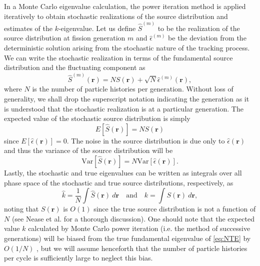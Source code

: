 In a Monte Carlo eigenvalue calculation, the power iteration method is applied
iteratively to obtain stochastic realizations of the source distribution and
estimates of the $k$-eigenvalue. Let us define $\hat{S}^{(m)}$ to be the
realization of the source distribution at fission generation $m$ and
$\hat{\epsilon}^{(m)}$ be the deviation from the deterministic solution arising
from the stochastic nature of the tracking process. We can write the stochastic
realization in terms of the fundamental source distribution and the fluctuating
component as \cite{ane-brissenden-1986}
\begin{equation}
  \label{eq:source}
  \hat{S}^{(m)}(\mathbf{r})= N S(\mathbf{r}) + \sqrt{N}
  \hat{\epsilon}^{(m)}(\mathbf{r}),
\end{equation}
where $N$ is the number of particle histories per generation. Without loss of
generality, we shall drop the superscript notation indicating the generation as
it is understood that the stochastic realization is at a particular
generation. The expected value of the stochastic source distribution is simply
\begin{equation}
  E \left[ \hat{S}(\mathbf{r})\right] = N S (\mathbf{r})
\end{equation}
since $E \left[ \hat{\epsilon}(\mathbf{r})\right] = 0$. The noise in the source
distribution is due only to $\hat{\epsilon}(\mathbf{r})$ and thus the variance
of the source distribution will be
\begin{equation}
  \text{Var} \left[ \hat{S}(\mathbf{r})\right] = N \text{Var} \left[
    \hat{\epsilon}(\mathbf{r}) \right].
\end{equation}
Lastly, the stochastic and true eigenvalues can be written as integrals over all
phase space of the stochastic and true source distributions, respectively, as
\begin{equation}
  \label{eq:k_to_source}
  \hat{k} = \frac{1}{N} \int \hat{S}(\mathbf{r}) \: d\mathbf{r} \quad \text{and}
  \quad k = \int S(\mathbf{r}) \: d\mathbf{r},
\end{equation}
noting that $S(\mathbf{r})$ is $O(1)$ since the true source distribution is not
a function of $N$ (see Nease et al. \cite{mc-nease-2009} for a thorough
discussion). One should note that the expected value $k$ calculated by Monte
Carlo power iteration (i.e. the method of successive generations) will be biased
from the true fundamental eigenvalue of \eqref{eq:NTE} by $O(1/N)$
\cite{ane-brissenden-1986}, but we will assume henceforth that the number of
particle histories per cycle is sufficiently large to neglect this bias.

